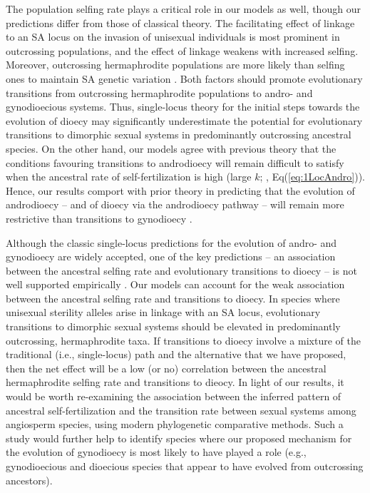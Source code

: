 \documentclass{article}
\begin{document}
The population selfing rate plays a critical role in our models as well, though our predictions differ from those of classical theory. The facilitating effect of linkage to an SA locus on the invasion of unisexual individuals is most prominent in outcrossing populations, and the effect of linkage weakens with increased selfing. Moreover, outcrossing hermaphrodite populations are more likely than selfing ones to maintain SA genetic variation \citep{JordanConnallon2014,Olito2017}. Both factors should promote evolutionary transitions from outcrossing hermaphrodite populations to andro- and gynodioecious systems. Thus, single-locus theory for the initial steps towards the evolution of dioecy may significantly underestimate the potential for evolutionary transitions to dimorphic sexual systems in predominantly outcrossing ancestral species. On the other hand, our models agree with previous theory that the conditions favouring transitions to androdioecy will remain difficult to satisfy when the ancestral rate of self-fertilization is high (large $k$; \citealt{Charlesworth1978a}, Eq(\ref{eq:1LocAndro})). Hence, our results comport with prior theory in predicting that the evolution of androdioecy -- and of dioecy via the androdioecy pathway -- will remain more restrictive than transitions to gynodioecy \citep{Charlesworth1978a, Charlesworth2006, KaferPannell2017, Renner2014}.

Although the classic single-locus predictions for the evolution of andro- and gynodioecy are widely accepted, one of the key predictions -- an association between the ancestral selfing rate and evolutionary transitions to dioecy -- is not well supported empirically \citep{Charlesworth1985, Charlesworth2006, Renner2014}. Our models can account for the weak association between the ancestral selfing rate and transitions to dioecy. In species where unisexual sterility alleles arise in linkage with an SA locus, evolutionary transitions to dimorphic sexual systems should be elevated in predominantly outcrossing, hermaphrodite taxa. If transitions to dioecy involve a mixture of the traditional (i.e., single-locus) path and the alternative that we have proposed,  then the net effect will be a low (or no) correlation between the ancestral hermaphrodite selfing rate and transitions to dieocy. In light of our results, it would be worth re-examining the association between the inferred pattern of ancestral self-fertilization and the transition rate between sexual systems among angiosperm species, using modern phylogenetic comparative methods. Such a study would further help to identify species where our proposed mechanism for the evolution of gynodioecy is most likely to have played a role (e.g., gynodioecious and dioecious species that appear to have evolved from outcrossing ancestors).
\end{document}
